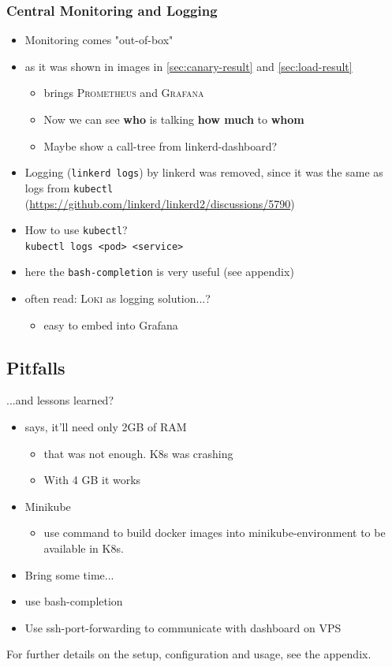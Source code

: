 \subsubsection{Central Monitoring and Logging}
\begin{itemize}
	\item Monitoring comes "out-of-box"
	\item as it was shown in images in \autoref{sec:canary-result} and \autoref{sec:load-result}
	\begin{itemize}
		\item \linkerd{} brings \textsc{Prometheus} and \textsc{Grafana}
		\item  Now we can see \textbf{who} is talking \textbf{how much} to \textbf{whom}
		\item Maybe show a call-tree from linkerd-dashboard?
	\end{itemize}

	\item Logging (\lstinline|linkerd logs|) by linkerd was removed, since it was the same as logs from \lstinline|kubectl|\\
	(\url{https://github.com/linkerd/linkerd2/discussions/5790})
	\item How to use \lstinline|kubectl|?\\
		\lstinline|kubectl logs <pod> <service>|
	\item here the \lstinline|bash-completion| is very useful (see appendix)
	\item often read: \textsc{Loki} as logging solution...?
	\begin{itemize}
		\item easy to embed into  Grafana
	\end{itemize}
\end{itemize}


\subsection{Pitfalls}
...and lessons learned?
\begin{itemize}
	\item \linkerd{} says, it'll need only 2GB of RAM 
	\begin{itemize}
		\item that was not enough. K8s was crashing
		\item With 4 GB it works
	\end{itemize}

	\item Minikube
	\begin{itemize}
		\item use command to build docker images into minikube-environment to be available in K8s.
	\end{itemize}

	\item Bring some time...
	\item use bash-completion
	\item Use ssh-port-forwarding to communicate with dashboard on VPS	
\end{itemize}

For further details on the setup, configuration and usage, see the appendix.